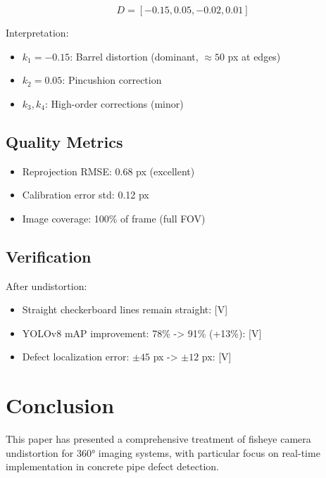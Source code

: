 \documentclass[11pt,a4paper,oneside]{article}
\begin{document}
\begin{equation}
D = [-0.15, 0.05, -0.02, 0.01]
\label{eq:insta360_D}
\end{equation}

Interpretation:
\begin{itemize}
    \item $k_1 = -0.15$: Barrel distortion (dominant, $\approx 50$ px at edges)
    \item $k_2 = 0.05$: Pincushion correction
    \item $k_3, k_4$: High-order corrections (minor)
\end{itemize}

\subsection{Quality Metrics}

\begin{itemize}
    \item Reprojection RMSE: 0.68 px (excellent)
    \item Calibration error std: 0.12 px
    \item Image coverage: 100\% of frame (full FOV)
\end{itemize}

\subsection{Verification}

After undistortion:
\begin{itemize}
    \item Straight checkerboard lines remain straight: [V]
    \item YOLOv8 mAP improvement: 78\% -> 91\% (+13\%): [V]
    \item Defect localization error: $\pm 45$ px -> $\pm 12$ px: [V]
\end{itemize}


\section{Conclusion}
\label{sec:conclusion}

This paper has presented a comprehensive treatment of fisheye camera undistortion for 360° imaging systems, with particular focus on real-time implementation in concrete pipe defect detection. 
\end{document}
